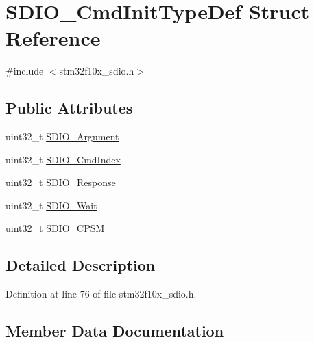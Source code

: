 \hypertarget{struct_s_d_i_o___cmd_init_type_def}{}\section{S\+D\+I\+O\+\_\+\+Cmd\+Init\+Type\+Def Struct Reference}
\label{struct_s_d_i_o___cmd_init_type_def}


{\ttfamily \#include $<$stm32f10x\+\_\+sdio.\+h$>$}

\subsection*{Public Attributes}
\begin{DoxyCompactItemize}
\item 
uint32\+\_\+t \hyperlink{struct_s_d_i_o___cmd_init_type_def_a37dfc4d7191ec10cffdb05ecf58d4807}{S\+D\+I\+O\+\_\+\+Argument}
\item 
uint32\+\_\+t \hyperlink{struct_s_d_i_o___cmd_init_type_def_ab5e1df1f0e8d48a308edfb59a6f80fb4}{S\+D\+I\+O\+\_\+\+Cmd\+Index}
\item 
uint32\+\_\+t \hyperlink{struct_s_d_i_o___cmd_init_type_def_aecb203e21321126d5f05c34787cacfd2}{S\+D\+I\+O\+\_\+\+Response}
\item 
uint32\+\_\+t \hyperlink{struct_s_d_i_o___cmd_init_type_def_a582258554233ff8550bd04d2d790c67c}{S\+D\+I\+O\+\_\+\+Wait}
\item 
uint32\+\_\+t \hyperlink{struct_s_d_i_o___cmd_init_type_def_ab0e869ae285cc132478dd743c28cd8e2}{S\+D\+I\+O\+\_\+\+C\+P\+SM}
\end{DoxyCompactItemize}


\subsection{Detailed Description}


Definition at line 76 of file stm32f10x\+\_\+sdio.\+h.



\subsection{Member Data Documentation}
\mbox{\label{struct_s_d_i_o___cmd_init_type_def_a37dfc4d7191ec10cffdb05ecf58d4807}} 
